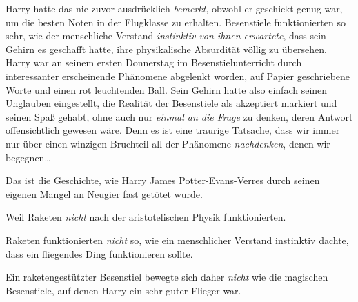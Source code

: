 Harry hatte das nie zuvor ausdrücklich \emph{bemerkt}, obwohl er geschickt genug war, um die besten Noten in der Flugklasse zu erhalten. Besenstiele funktionierten so sehr, wie der menschliche Verstand \emph{instinktiv von ihnen erwartete}, dass sein Gehirn es geschafft hatte, ihre physikalische Absurdität völlig zu übersehen. Harry war an seinem ersten Donnerstag im Besenstielunterricht durch interessanter erscheinende Phänomene abgelenkt worden, auf Papier geschriebene Worte und einen rot leuchtenden Ball. Sein Gehirn hatte also einfach seinen Unglauben eingestellt, die Realität der Besenstiele als akzeptiert markiert und seinen Spaß gehabt, ohne auch nur \emph{einmal an die Frage} zu denken, deren Antwort offensichtlich gewesen wäre. Denn es ist eine traurige Tatsache, dass wir immer nur über einen winzigen Bruchteil all der Phänomene \emph{nachdenken}, denen wir begegnen…

Das ist die Geschichte, wie Harry James Potter-Evans-Verres durch seinen eigenen Mangel an Neugier fast getötet wurde.

Weil Raketen \emph{nicht} nach der aristotelischen Physik funktionierten.

Raketen funktionierten \emph{nicht} so, wie ein menschlicher Verstand instinktiv dachte, dass ein fliegendes Ding funktionieren sollte.

Ein raketengestützter Besenstiel bewegte sich daher \emph{nicht} wie die magischen Besenstiele, auf denen Harry ein sehr guter Flieger war.

